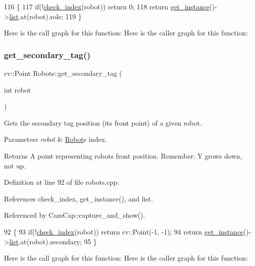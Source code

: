 \begin{DoxyCode}
116                               \{
117     \textcolor{keywordflow}{if}(!\hyperlink{robots_8hpp_ae3e6ae8f87cdc750c0b99bc609d9ae43}{check\_index}(robot)) \textcolor{keywordflow}{return} 0;
118     \textcolor{keywordflow}{return} \hyperlink{class_robots_a589bce74db5f34af384952d48435168f}{get\_instance}()->\hyperlink{class_robots_a2c6b77265028f82a4342ca1ef15ed305}{list}.at(robot).role;
119 \}
\end{DoxyCode}
Here is the call graph for this function\+:
Here is the caller graph for this function\+:
\mbox{\label{class_robots_a2ebc2bd5efa2313e9f39d676fa70f86a}} 
\subsubsection{\texorpdfstring{get\+\_\+secondary\+\_\+tag()}{get\_secondary\_tag()}}
{\footnotesize\ttfamily cv\+::\+Point Robots\+::get\+\_\+secondary\+\_\+tag (\begin{DoxyParamCaption}\item[{int}]{robot }\end{DoxyParamCaption})\hspace{0.3cm}{\ttfamily [static]}}

Gets the secondary tag position (it\textquotesingle{}s front point) of a given robot. 
\begin{DoxyParams}{Parameters}
{\em robot} & \hyperlink{struct_robots_1_1_robot}{Robot}\textquotesingle{}s index. \\
\hline
\end{DoxyParams}
\begin{DoxyReturn}{Returns}
A point representing robot\textquotesingle{}s front position. Remember\+: Y grows down, not up. 
\end{DoxyReturn}


Definition at line 92 of file robots.\+cpp.



References check\+\_\+index, get\+\_\+instance(), and list.



Referenced by Cam\+Cap\+::capture\+\_\+and\+\_\+show().


\begin{DoxyCode}
92                                            \{
93     \textcolor{keywordflow}{if}(!\hyperlink{robots_8hpp_ae3e6ae8f87cdc750c0b99bc609d9ae43}{check\_index}(robot)) \textcolor{keywordflow}{return} cv::Point(-1, -1);
94     \textcolor{keywordflow}{return} \hyperlink{class_robots_a589bce74db5f34af384952d48435168f}{get\_instance}()->\hyperlink{class_robots_a2c6b77265028f82a4342ca1ef15ed305}{list}.at(robot).secondary;
95 \}
\end{DoxyCode}
Here is the call graph for this function\+:
Here is the caller graph for this function\+:
\mbox{\label{class_robots_abb471ba5ef5331f0488a9490d1af0c86}} 

